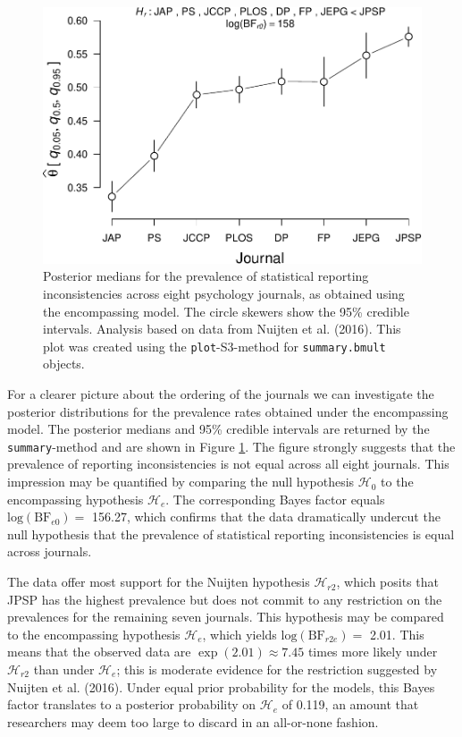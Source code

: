 \documentclass[
  english,
  man,floatsintext]{apa6}
\begin{document}
\begin{figure}
\centering
\includegraphics{Rpackage_paper_files/figure-latex/journals-1.pdf}
\caption{\label{fig:journals}Posterior medians for the prevalence of statistical reporting inconsistencies across eight psychology journals, as obtained using the encompassing model. The circle skewers show the 95\% credible intervals. Analysis based on data from Nuijten et al. (2016). This plot was created using the \texttt{plot}-S3-method for \texttt{summary.bmult} objects.}
\end{figure}

For a clearer picture about the ordering of the journals we can investigate the posterior distributions for the prevalence rates obtained under the encompassing model. The posterior medians and 95\% credible intervals are returned by the \texttt{summary}-method and are shown in Figure \ref{fig:journals}. The figure strongly suggests that the prevalence of reporting inconsistencies is not equal across all eight journals. This impression may be quantified by comparing the null hypothesis \(\mathcal{H}_0\) to the encompassing hypothesis \(\mathcal{H}_e\). The corresponding Bayes factor equals \(\text{log}(\text{BF}_{e0}) =\) 156.27, which confirms that the data dramatically undercut the null hypothesis that the prevalence of statistical reporting inconsistencies is equal across journals.

The data offer most support for the Nuijten hypothesis \(\mathcal{H}_{r2}\), which posits that JPSP has the highest prevalence but does not commit to any restriction on the prevalences for the remaining seven journals. This hypothesis may be compared to the encompassing hypothesis \(\mathcal{H}_e\), which yields \(\text{log}(\text{BF}_{r2e}) =\) 2.01. This means that the observed data are \(\exp(2.01) \approx 7.45\) times more likely under \(\mathcal{H}_{r2}\) than under \(\mathcal{H}_e\); this is moderate evidence for the restriction suggested by Nuijten et al. (2016). Under equal prior probability for the models, this Bayes factor translates to a posterior probability on \(\mathcal{H}_e\) of 0.119, an amount that researchers may deem too large to discard in an all-or-none fashion.
\end{document}
